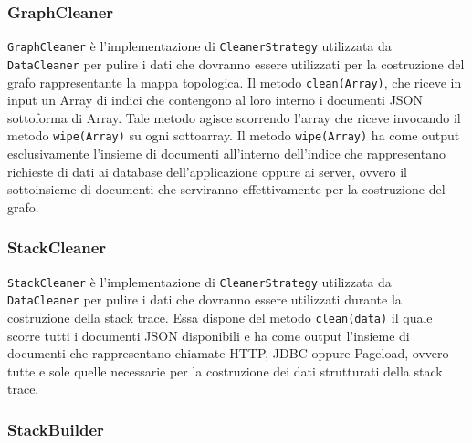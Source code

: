	
	
\subsubsection{GraphCleaner}
\label{sec:GraphCleaner}

\texttt{GraphCleaner} è l'implementazione di \texttt{CleanerStrategy} utilizzata da \texttt{DataCleaner} per pulire i dati che dovranno essere utilizzati per la costruzione del grafo rappresentante la mappa topologica. Il metodo \texttt{clean(Array)}, che riceve in input un Array di indici che contengono al loro interno i documenti JSON sottoforma di Array. Tale metodo agisce scorrendo l'array che riceve invocando il metodo \texttt{wipe(Array)} su ogni sottoarray. Il metodo \texttt{wipe(Array)} ha come output esclusivamente l'insieme di documenti all'interno dell'indice che rappresentano richieste di dati ai database dell'applicazione oppure ai server, ovvero il sottoinsieme di documenti che serviranno effettivamente per la costruzione del grafo.
	
\subsubsection{StackCleaner}
\label{sec:StackCleaner}

\texttt{StackCleaner} è l'implementazione di \texttt{CleanerStrategy} utilizzata da \texttt{DataCleaner} per pulire i dati che dovranno essere utilizzati durante la costruzione della stack trace. Essa dispone del metodo \texttt{clean(data)} il quale scorre tutti i documenti JSON disponibili e ha come output l'insieme di documenti che rappresentano chiamate HTTP, JDBC oppure Pageload, ovvero tutte e sole quelle necessarie per la costruzione dei dati strutturati della stack trace.



\subsubsection{StackBuilder}
\label{sec:StackBuilder}

